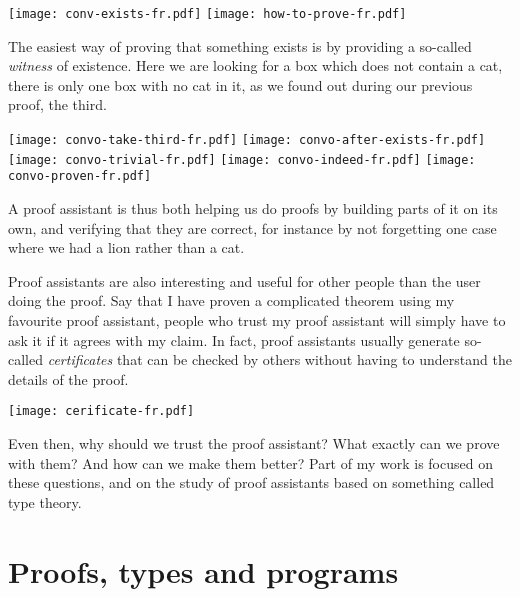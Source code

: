 \begin{center}
  \texttt{[image: conv-exists-fr.pdf]}
  \texttt{[image: how-to-prove-fr.pdf]}
\end{center}

The easiest way of proving that something exists is by providing a so-called
\emph{witness} of existence. Here we are looking for a box which does not
contain a cat, there is only one box with no cat in it, as we found out during
our previous proof, the third.

\begin{center}
  \texttt{[image: convo-take-third-fr.pdf]}
  \texttt{[image: convo-after-exists-fr.pdf]}
  \texttt{[image: convo-trivial-fr.pdf]}
  \texttt{[image: convo-indeed-fr.pdf]}
  \texttt{[image: convo-proven-fr.pdf]}
\end{center}

A proof assistant is thus both helping us do proofs by building parts of it on
its own, and verifying that they are correct, for instance by not forgetting one
case where we had a lion rather than a cat.

Proof assistants are also interesting and useful for other people than the user
doing the proof. Say that I have proven a complicated theorem using my favourite
proof assistant, people who trust my proof assistant will simply have to ask it
if it agrees with my claim.
In fact, proof assistants usually generate so-called \emph{certificates} that
can be checked by others without having to understand the details of the proof.
\begin{center}
  \texttt{[image: cerificate-fr.pdf]}
\end{center}

Even then, why should we trust the proof assistant? What exactly can we prove
with them? And how can we make them better?
Part of my work is focused on these questions, and on the study of proof
assistants based on something called type theory.

\section{Proofs, types and programs}

